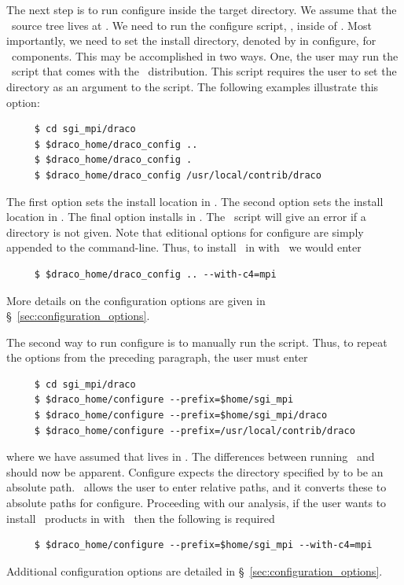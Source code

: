 The next step is to run configure inside the target directory.  We
assume that the \draco\ source tree lives at \dracohome.  We need to
run the configure script, \dracohome{}, inside of
.  Most importantly, we need to set the
install directory, denoted by  in configure, for
\draco\ components.  This may be accomplished in two ways.  One, the
user may run the \dracoconf\ script that comes with the \draco\ 
distribution.  This script requires the user to set the
 directory as an argument to the script. The following
examples illustrate this option:
\begin{verbatim}
     $ cd sgi_mpi/draco
     $ $draco_home/draco_config ..
     $ $draco_home/draco_config .
     $ $draco_home/draco_config /usr/local/contrib/draco
\end{verbatim} %
The first option sets the install location in .  The
second option sets the install location in \comp{sgi\_\,mpi/draco/}.
The final option installs in \comp{/usr/local/contrib/draco/}.  The
\dracoconf\ script will give an error if a \comp{--prefix} directory
is not given.  Note that editional options for configure are simply
appended to the command-line.  Thus, to install \draco\ in
 with \mpi\ we would enter
\begin{verbatim}
     $ $draco_home/draco_config .. --with-c4=mpi
\end{verbatim}
More details on the configuration options are given in
\S~\ref{sec:configuration_options}.

The second way to run configure is to manually run the
\dracohome{} script.  Thus, to repeat the options from 
the preceding paragraph, the user must enter
\begin{verbatim}
     $ cd sgi_mpi/draco
     $ $draco_home/configure --prefix=$home/sgi_mpi
     $ $draco_home/configure --prefix=$home/sgi_mpi/draco
     $ $draco_home/configure --prefix=/usr/local/contrib/draco
\end{verbatim} %
where we have assumed that  lives in .
The differences between running \dracoconf\ and
\dracohome{} should now be apparent.  Configure
expects the directory specified by  to be an absolute
path.  \dracoconf\ allows the user to enter relative paths, and it
converts these to absolute paths for configure.  Proceeding with our
analysis, if the user wants to install \draco\ products in
 with \mpi\ then the following is required
\begin{verbatim}
     $ $draco_home/configure --prefix=$home/sgi_mpi --with-c4=mpi
\end{verbatim} %
Additional configuration options are detailed in
\S~\ref{sec:configuration_options}. 


